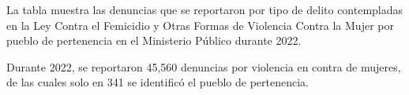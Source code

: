 \justifying La tabla muestra las denuncias que se reportaron por tipo de delito contempladas en la Ley Contra el Femicidio y Otras Formas de Violencia Contra la Mujer por pueblo de pertenencia en el Ministerio Público durante 2022. 

Durante 2022, se reportaron 45,560 denuncias por violencia en contra de mujeres, de las cuales solo en 341 se identificó el pueblo de pertenencia.
